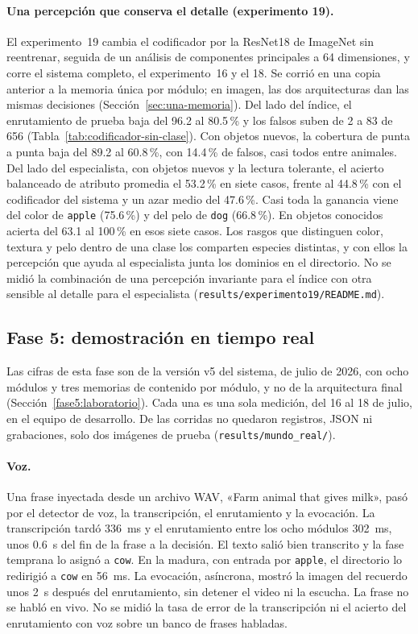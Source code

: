 \paragraph{Una percepción que conserva el detalle (experimento 19).}
El experimento~19 cambia el codificador por la ResNet18 de ImageNet sin reentrenar,
seguida de un análisis de componentes principales a 64 dimensiones, y corre el sistema
completo, el experimento~16 y el 18.
Se corrió en una copia anterior a la memoria única por módulo; en imagen, las dos
arquitecturas dan las mismas decisiones (Sección~\ref{sec:una-memoria}).
Del lado del índice, el enrutamiento de prueba baja del 96.2 al 80.5\,\% y los falsos
suben de 2 a 83 de 656 (Tabla~\ref{tab:codificador-sin-clase}).
Con objetos nuevos, la cobertura de punta a punta baja del 89.2 al 60.8\,\%, con
14.4\,\% de falsos, casi todos entre animales.
Del lado del especialista, con objetos nuevos y la lectura tolerante, el acierto
balanceado de atributo promedia el 53.2\,\% en siete casos, frente al 44.8\,\% con el
codificador del sistema y un azar medio del 47.6\,\%.
Casi toda la ganancia viene del color de \texttt{apple} (75.6\,\%) y del pelo de
\texttt{dog} (66.8\,\%).
En objetos conocidos acierta del 63.1 al 100\,\% en esos siete casos.
Los rasgos que distinguen color, textura y pelo dentro de una clase los comparten
especies distintas, y con ellos la percepción que ayuda al especialista junta los
dominios en el directorio.
No se midió la combinación de una percepción invariante para el índice con otra sensible
al detalle para el especialista (\texttt{results/experimento19/README.md}).

\subsection{Fase 5: demostración en tiempo real}
\label{sec:fase5-resultados}

Las cifras de esta fase son de la versión v5 del sistema, de julio de 2026, con ocho
módulos y tres memorias de contenido por módulo, y no de la arquitectura final
(Sección~\ref{fase5:laboratorio}).
Cada una es una sola medición, del 16 al 18 de julio, en el equipo de desarrollo.
De las corridas no quedaron registros, JSON ni grabaciones, solo dos imágenes de prueba
(\texttt{results/mundo\_real/}).

\paragraph{Voz.}
Una frase inyectada desde un archivo WAV, «Farm animal that gives milk», pasó por el
detector de voz, la transcripción, el enrutamiento y la evocación.
La transcripción tardó 336~ms y el enrutamiento entre los ocho módulos 302~ms, unos
0.6~s del fin de la frase a la decisión.
El texto salió bien transcrito y la fase temprana lo asignó a \texttt{cow}.
En la madura, con entrada por \texttt{apple}, el directorio lo redirigió a \texttt{cow}
en 56~ms.
La evocación, asíncrona, mostró la imagen del recuerdo unos 2~s después del
enrutamiento, sin detener el video ni la escucha.
La frase no se habló en vivo.
No se midió la tasa de error de la transcripción ni el acierto del enrutamiento con voz
sobre un banco de frases habladas.

